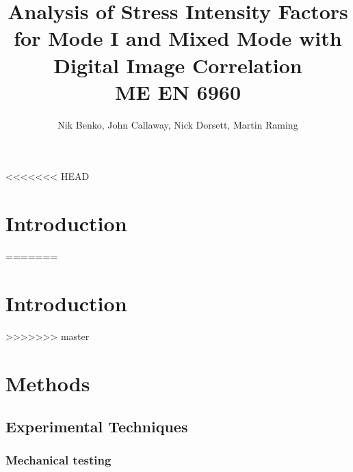 \documentclass[12pt]{article}
\begin{document}
\title{ Analysis of Stress Intensity Factors for Mode I and Mixed Mode with Digital Image Correlation \\ \normalsize{ME EN 6960}}
\author{Nik Benko, John Callaway, Nick Dorsett, Martin Raming}
\maketitle

<<<<<<< HEAD
\begin{abstract} 

\end{abstract}

\section{Introduction} 
=======
\begin{abstract}%
\end{abstract}

\section{Introduction} %
>>>>>>> master

\section{Methods}

\subsection{Experimental Techniques} 
\subsubsection{Mechanical testing} %
\end{document}
